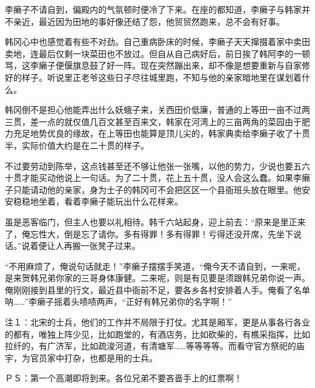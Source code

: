 李癞子不请自到，偏殿内的气氛顿时便冷了下来。在座的都知道，李癞子与韩家并不亲近，最近因为田地的事好像还结了怨，他贸贸然跑来，总不会有好事。

韩冈心中也感觉着有些不对劲。自己重病卧床的时候，李癞子天天撺掇着家中卖田卖地，连最后仅剩一块菜田也不放过。但自从自己病好后，前日挨了韩阿李的一顿骂，这李癞子便偃旗息鼓了好一阵。现在突然蹦出来，却不像是想要重新与自家修好的样子。听说里正老爷这些日子尽往城里跑，不知与他的亲家暗地里在谋划着什么。

韩冈倒不是担心他能弄出什么妖蛾子来，关西田价低廉，普通的上等田一亩不过两三贯，差一点的就仅值几百文甚至百来文，韩家在河湾上的三亩两角的菜园由于肥力充足地势优良的缘故，在上等田也能算是顶儿尖的，韩家典卖给李癞子收了十贯半，实际价值大约是在二十贯的样子。

不过要劳动到陈举，这点钱甚至还不够让他张一张嘴，以他的势力，少说也要五六十贯才能买动他说上一句话。为了二十贯，花上五十贯，没人会这么蠢。如果李癞子只能请动他的亲家，身为士子的韩冈可不会把区区一个县衙班头放在眼里。他安安稳稳地坐着，看着李癞子能玩出什么花样来。

虽是恶客临门，但主人也要以礼相待。韩千六站起身，迎上前去：“原来是里正来了，俺忘性大，倒是忘了请你。多有得罪！多有得罪！亏得还没开席，先坐下说话。”说着便让人再搬一张凳子过来。

“不用麻烦了，俺说句话就走！”李癞子摆摆手笑道，“俺今天不请自到，一来呢，是来贺韩兄弟你家的三哥身体康健。二来呢，则是有见要是须跟韩兄弟你说一声。俺刚刚接到县里的行文，最近县中衙前不足，要各乡各村安排着人手。俺看了名单呐……”李癞子摇着头啧啧两声，“正好有韩兄弟你的名字啊！”

注１：北宋的士兵，他们的工作并不局限于打仗。尤其是厢军，更是从事各行各业的都有，唯独上阵少见，比如跑堂的，有酒店务，比如砍柴的，有樵采指挥，比如拉纤的，有广济军，比如疏浚河道，有清塘军……等等等等。而看守官方祭祀的庙宇，为官员家中打杂，也都是用的士兵。

ＰＳ：第一个高潮即将到来。各位兄弟不要吝啬手上的红票啊！

